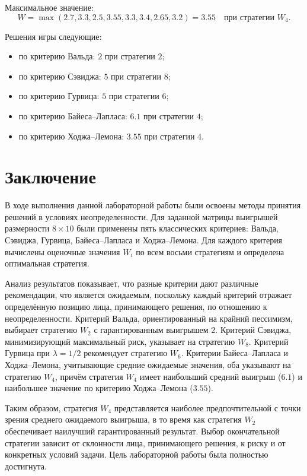 Максимальное значение:
\[
W = \max(2.7, 3.3, 2.5, 3.55, 3.3, 3.4, 2.65, 3.2) = 3.55 \quad \text{при стратегии } W_4.
\]


Решения игры следующие:
\begin{itemize}
    \item по критерию Вальда: $2$ при стратегии $2$;
    \item по критерию Сэвиджа: $5$ при стратегии $8$;
    \item по критерию Гурвица: $5$ при стратегии $6$;
    \item по критерию Байеса--Лапласа: $6.1$ при стратегии $4$;
    \item по критерию Ходжа--Лемона: $3.55$ при стратегии $4$.
\end{itemize}

\clearpage

\section{Заключение}

В ходе выполнения данной лабораторной работы были освоены методы принятия решений в условиях неопределенности. Для заданной матрицы выигрышей размерности $8 \times 10$ были применены пять классических критериев: Вальда, Сэвиджа, Гурвица, Байеса--Лапласа и Ходжа--Лемона. Для каждого критерия вычислены оценочные значения $W_i$ по всем восьми стратегиям и определена оптимальная стратегия.

Анализ результатов показывает, что разные критерии дают различные рекомендации, что является ожидаемым, поскольку каждый критерий отражает определённую позицию лица, принимающего решения, по отношению к неопределенности. Критерий Вальда, ориентированный на крайний пессимизм, выбирает стратегию $W_2$ с гарантированным выигрышем $2$. Критерий Сэвиджа, минимизирующий максимальный риск, указывает на стратегию $W_8$. Критерий Гурвица при $\lambda=1/2$ рекомендует стратегию $W_6$. Критерии Байеса--Лапласа и Ходжа--Лемона, учитывающие средние ожидаемые значения, оба указывают на стратегию $W_4$, причём стратегия $W_4$ имеет наибольший средний выигрыш ($6.1$) и наибольшее значение по критерию Ходжа--Лемона ($3.55$).

Таким образом, стратегия $W_4$ представляется наиболее предпочтительной с точки зрения среднего ожидаемого выигрыша, в то время как стратегия $W_2$ обеспечивает наилучший гарантированный результат. Выбор окончательной стратегии зависит от склонности лица, принимающего решения, к риску и от конкретных условий задачи. Цель лабораторной работы была полностью достигнута.

